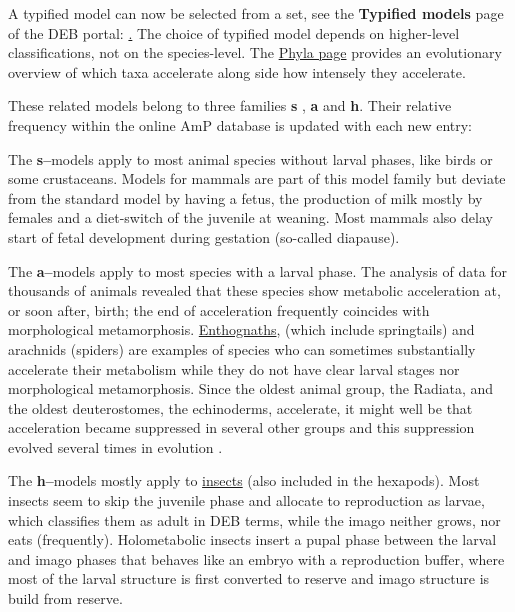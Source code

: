 A typified model can now be selected from a set, see the \textbf{Typified models} page of the DEB portal: \href{https://debportal.debtheory.org/docs/Typified_models.html}. 
The choice of typified model depends on higher-level classifications, not on the species-level. 
The \href{https://www.bio.vu.nl/thb/deb/deblab/add_my_pet/phyla.html}{Phyla page} provides an evolutionary overview of which taxa accelerate along side how intensely they accelerate. 

These related models belong to three families \textbf{s} , \textbf{a} and \textbf{h}. 
Their relative frequency within the online AmP database is updated with each new entry: 

The \textbf{s--}models apply to most animal species without larval phases, like birds or some crustaceans. 
Models for mammals are part of this model family but deviate from the standard model by having a fetus, the production of milk mostly by females and a diet-switch of the juvenile at weaning. 
Most mammals also delay start of fetal development during gestation (so-called diapause).

The \textbf{a--}models apply to most species with a larval phase. 
The analysis of data for thousands of animals revealed that these species show metabolic acceleration at, or soon after, birth; 
the end of acceleration frequently coincides with morphological metamorphosis.
\href{https://en.wikipedia.org/wiki/Entognatha}{Enthognaths}, (which include springtails) and arachnids (spiders) are examples of species who can sometimes substantially accelerate their metabolism while they do not have clear larval stages nor morphological metamorphosis.
Since the oldest animal group, the Radiata, and the oldest deuterostomes, the echinoderms, accelerate, it might well be that acceleration became  suppressed in several other groups and this suppression evolved several times in evolution \cite{Kooy2014}. 



The \textbf{h--}models mostly apply to \href{https://en.wikipedia.org/wiki/Insect}{insects} (also included in the hexapods). Most insects seem to skip the juvenile phase and allocate to reproduction as larvae, which classifies them as adult in DEB terms, while the imago neither grows, nor eats (frequently).
Holometabolic insects insert a pupal phase between the larval and imago phases that behaves like an embryo with a reproduction buffer, where most of the larval structure is first converted to reserve \cite{LlanMarq2015} and imago structure is build from reserve.


